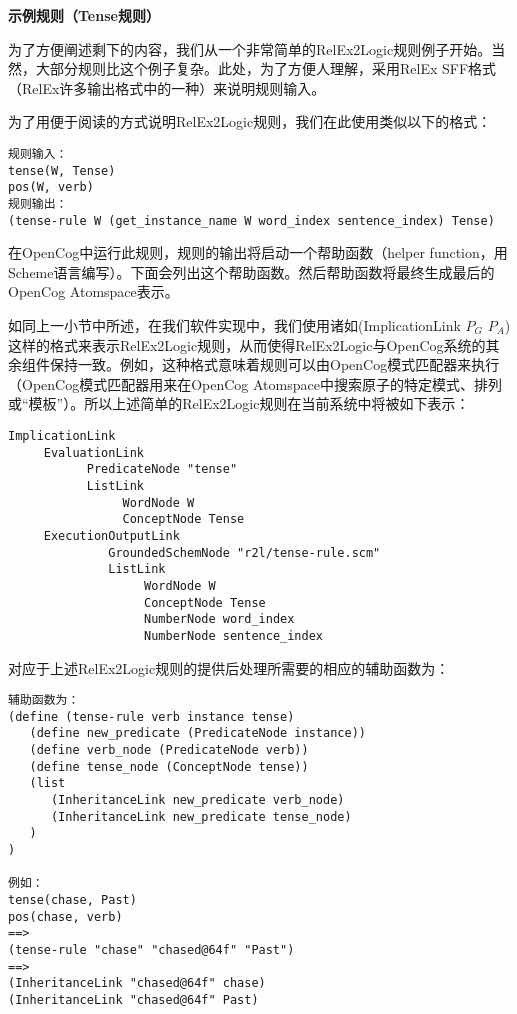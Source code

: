 {\bf 示例规则（Tense规则）}

为了方便阐述剩下的内容，我们从一个非常简单的RelEx2Logic规则例子开始。当然，大部分规则比这个例子复杂。此处，为了方便人理解，采用RelEx SFF格式（RelEx许多输出格式中的一种）来说明规则输入。

为了用便于阅读的方式说明RelEx2Logic规则，我们在此使用类似以下的格式：

\begin{verbatim}
规则输入：
tense(W, Tense)
pos(W, verb)
规则输出：
(tense-rule W (get_instance_name W word_index sentence_index) Tense)
\end{verbatim}

在OpenCog中运行此规则，规则的输出将启动一个帮助函数（helper function，用Scheme语言编写）。下面会列出这个帮助函数。然后帮助函数将最终生成最后的OpenCog Atomspace表示。

如同上一小节中所述，在我们软件实现中，我们使用诸如(ImplicationLink $P_G$ $P_A$)这样的格式来表示RelEx2Logic规则，从而使得RelEx2Logic与OpenCog系统的其余组件保持一致。例如，这种格式意味着规则可以由OpenCog模式匹配器来执行（OpenCog模式匹配器用来在OpenCog Atomspace中搜索原子的特定模式、排列或“模板”）。所以上述简单的RelEx2Logic规则在当前系统中将被如下表示：

\begin{verbatim}
ImplicationLink
     EvaluationLink
           PredicateNode "tense"
           ListLink
                WordNode W
                ConceptNode Tense
     ExecutionOutputLink
              GroundedSchemNode "r2l/tense-rule.scm"
              ListLink
                   WordNode W
                   ConceptNode Tense
                   NumberNode word_index
                   NumberNode sentence_index

\end{verbatim}

对应于上述RelEx2Logic规则的提供后处理所需要的相应的辅助函数为：

\begin{verbatim}
辅助函数为：
(define (tense-rule verb instance tense)
   (define new_predicate (PredicateNode instance))
   (define verb_node (PredicateNode verb)) 
   (define tense_node (ConceptNode tense))
   (list
      (InheritanceLink new_predicate verb_node)
      (InheritanceLink new_predicate tense_node)
   )
)

例如：
tense(chase, Past)
pos(chase, verb)
==>
(tense-rule "chase" "chased@64f" "Past")
==>
(InheritanceLink "chased@64f" chase)
(InheritanceLink "chased@64f" Past)

\end{verbatim}

